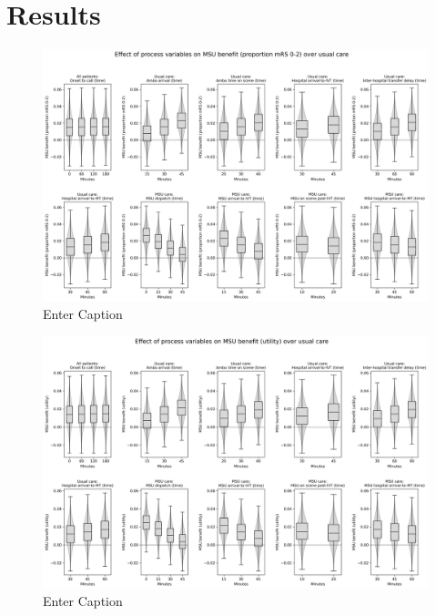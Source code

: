 \section{Results}

\begin{figure}
    \centering
    \includegraphics[width=1\linewidth]{images/msu_net_mrs_0-2_benefit.png}
    \caption{Enter Caption}
    \label{fig:enter-label}
\end{figure}

\begin{figure}
    \centering
    \includegraphics[width=1\linewidth]{images/msu_net_utility_benefit.png}
    \caption{Enter Caption}
    \label{fig:enter-label}
\end{figure}
